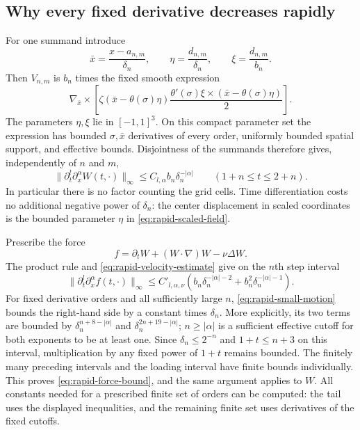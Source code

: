 \subsection{Why every fixed derivative decreases rapidly}
For one summand introduce
\[
 \bar x=\frac{x-a_{n,m}}{\delta_n},\qquad
 \eta=\frac{d_{n,m}}{\delta_n},\qquad
 \xi=\frac{d_{n,m}}{b_n}.
\]
Then $V_{n,m}$ is $b_n$ times the fixed smooth expression
\begin{equation}
 \nabla_{\bar x}\times\left[
  \zeta(\bar x-\theta(\sigma)\eta)
  \frac{\theta'(\sigma)\xi\times
          (\bar x-\theta(\sigma)\eta)}{2}
 \right].
 \label{eq:rapid-scaled-field}
\end{equation}
The parameters $\eta,\xi$ lie in $[-1,1]^3$.  On this compact parameter
set the expression has bounded $\sigma,\bar x$ derivatives of every order,
uniformly bounded spatial support, and effective bounds.  Disjointness
of the summands therefore gives, independently of $n$ and $m$,
\begin{equation}
 \|\partial_t^l\partial_x^\alpha W(t,\cdot)\|_\infty
 \leq C_{l,\alpha}b_n\delta_n^{-|\alpha|}
 \qquad(1+n\leq t\leq2+n).
 \label{eq:rapid-velocity-estimate}
\end{equation}
In particular there is no factor counting the grid cells.  Time
differentiation costs no additional negative power of $\delta_n$:
the center displacement in scaled coordinates is the bounded parameter
$\eta$ in \eqref{eq:rapid-scaled-field}.

Prescribe the force
\begin{equation}
 f=\partial_t W+(W\cdot\nabla)W-\nu\Delta W.
 \label{eq:rapid-residual}
\end{equation}
The product rule and \eqref{eq:rapid-velocity-estimate} give on the $n$th
step interval
\begin{equation}
 \|\partial_t^l\partial_x^\alpha f(t,\cdot)\|_\infty
 \leq C'_{l,\alpha,\nu}
 \left(b_n\delta_n^{-|\alpha|-2}
             +b_n^2\delta_n^{-|\alpha|-1}\right).
 \label{eq:rapid-residual-estimate}
\end{equation}
For fixed derivative orders and all sufficiently large $n$,
\eqref{eq:rapid-small-motion} bounds the right-hand side by a constant
times $\delta_n$. More explicitly, its two terms are bounded by
$\delta_n^{n+8-|\alpha|}$ and $\delta_n^{2n+19-|\alpha|}$;
$n\geq|\alpha|$ is a sufficient effective cutoff for both exponents
to be at least one. Since $\delta_n\leq2^{-n}$ and $1+t\leq n+3$ on
this interval, multiplication by any fixed power of $1+t$ remains
bounded.  The finitely many preceding intervals and the loading interval
have finite bounds individually.  This proves
\eqref{eq:rapid-force-bound}, and the same argument applies to $W$.
All constants needed for a prescribed finite set of orders can be
computed: the tail uses the displayed inequalities, and the remaining
finite set uses derivatives of the fixed cutoffs.

